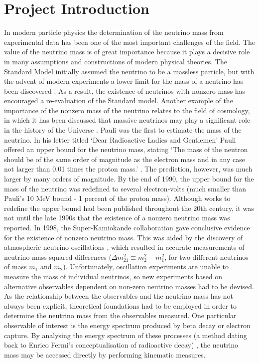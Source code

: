 \documentclass[a4paper,12pt, notitlepage]{article}
\begin{document}
\section{Project Introduction}
In modern particle physics the determination of the neutrino mass from experimental data has been one of the most important challenges of the field. The value of the neutrino mass is of great importance because it plays a decisive role in many assumptions and constructions of modern physical theories. The Standard Model initially assumed the neutrino to be a massless particle, but with the advent of modern experiments a lower limit for the mass of a neutrino has been discovered \cite{Formaggio2021}. As a result, the existence of neutrinos with nonzero mass has encouraged a re-evaluation of the Standard model. Another example of the importance of the nonzero mass of the neutrino relates to the field of cosmology, in which it has been discussed that massive neutrinos may play a significant role in the history of
the Universe \cite{Lesgourgues2006}.
Pauli was the first to estimate the mass of the neutrino. In his letter titled ‘Dear Radioactive Ladies and Gentlemen’ Pauli offered an upper bound for the neutrino mass, stating ‘The mass of the neutron should be of the same order of magnitude as the electron mass and in any case not larger than 0.01 times the proton mass.’ \cite{Pauli1930}.
The prediction, however, was much larger by many orders of magnitude. By the end of 1990, the upper bound for the mass of the neutrino was redefined to several electron-volts (much smaller than Pauli’s 10 MeV bound - 1 percent of the proton mass). Although works to redefine the upper bound had been published throughout the 20th century, it was not until the late 1990s that the existence of a nonzero neutrino mass was reported. 
In 1998, the Super-Kamiokande collaboration gave conclusive evidence for the existence of nonzero neutrino mass. This was aided by the discovery of atmospheric neutrino oscillations \cite{SuperKamiokande1998}, which resulted in accurate measurements of neutrino mass-squared differences ($\Delta m_{21}^{2} \equiv m_{2}^{2} - m_{1}^{2}$, for two different neutrinos of mass $m_{1}$ and $ m_{2}$). Unfortunately, oscillation experiments are unable to measure the mass of individual neutrinos, so new experiments based on alternative observables dependent on non-zero neutrino masses had to be devised. As the relationship between the observables and the neutrino mass has not always been explicit, theoretical foundations had to be employed in order to determine the neutrino mass from the observables measured. One particular observable of interest is the energy spectrum produced by beta decay or electron capture. By analysing the energy spectrum of these processes (a method dating back to Enrico Fermi's conceptualisation of radioactive decay) \cite{Fermi1938}, the neutrino mass may be accessed directly by performing kinematic measures.
\end{document}
